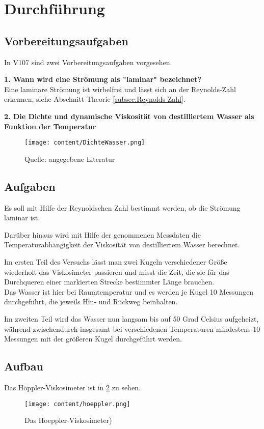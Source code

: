 \section{Durchführung}
\label{sec:Durchführung}

\subsection{Vorbereitungsaufgaben}

In V107 sind zwei Vorbereitungsaufgaben vorgesehen.

\textbf{1. Wann wird eine Strömung als "laminar" bezeichnet?} \\
Eine laminare Strömung ist wirbelfrei und lässt sich an der Reynolds-Zahl erkennen, siehe Abschnitt 
Theorie \ref{subsec:Reynolds-Zahl}.



\textbf{2. Die Dichte und dynamische Viskosität von destilliertem Wasser als Funktion der Temperatur}\\
\begin{figure}
    
    \centering
    \texttt{[image: content/DichteWasser.png]}
    \caption{Quelle: angegebene Literatur}
    \label{fig:DichteWasser}
\end{figure}




\subsection{Aufgaben}
\label{subsec:Aufgaben}

Es soll mit Hilfe der Reynoldschen Zahl bestimmt werden, ob die Strömung laminar ist.

Darüber hinaus wird mit Hilfe der genommenen Messdaten die Temperaturabhängigkeit der Viskosität von
destilliertem Wasser berechnet. 

Im ersten Teil des Versuchs lässt man zwei Kugeln verschiedener Größe wiederholt das Viskosimeter 
passieren und misst die Zeit, die sie für das Durchqueren einer markierten Strecke bestimmter Länge brauchen. \\
Das Wasser ist hier bei Raumtemperatur und es werden je Kugel 10 Messungen durchgeführt, die jeweils Hin- und Rückweg 
beinhalten.

Im zweiten Teil wird das Wasser nun langsam bis auf 50 Grad Celsius aufgeheizt, während zwischendurch 
insgesamt bei verschiedenen Temperaturen mindestens 10 Messungen mit der größeren Kugel durchgeführt werden. 




\subsection{Aufbau}
\label{subsec:Aufbau}

Das Höppler-Viskosimeter ist in \ref{fig:aufbau} zu sehen.

\begin{figure}
    
    \centering
    \texttt{[image: content/hoeppler.png]}
    \caption{Das Hoeppler-Viskosimeter)}
    \label{fig:aufbau}
\end{figure}